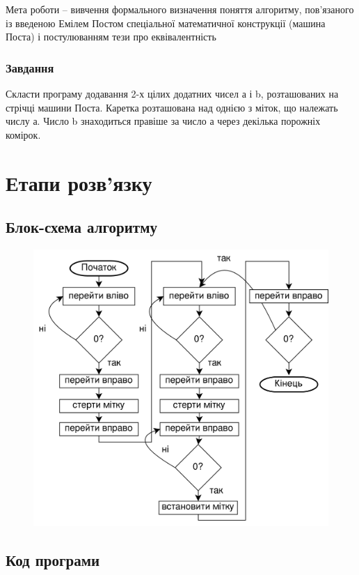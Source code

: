 \documentclass[a4paper, 12pt, oneside]{extarticle}
\begin{document}
\Margins



Мета роботи – вивчення формального визначення поняття алгоритму,
пов’язаного із введеною Емілем Постом спеціальної математичної
конструкції (машина Поста) і постулюванням тези про еквівалентність

\subsubsection*{Завдання}

Скласти програму додавання 2-х цілих додатних чисел а і b,
розташованих на стрічці машини Поста. Каретка розташована над
однією з міток, що належать числу а. Число b знаходиться правіше за
число а через декілька порожніх комірок.

\section*{Етапи розв'язку}

\subsection*{Блок-схема алгоритму}

\begin{figure}[h]
	\centering
	\includegraphics[width=.6\textwidth]{diag.png}
\end{figure}

\subsection*{Код програми}


%
%
\end{document}
